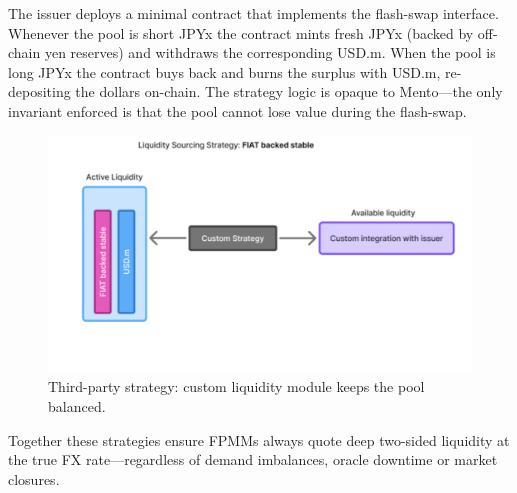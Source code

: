 \documentclass[a4paper]{article}
\providecommand{\hyp}{-}
\theoremstyle{definition}
\begin{document}
The issuer deploys a minimal contract that
implements the flash\hyp swap interface.  Whenever the pool is short JPYx the
contract mints fresh JPYx (backed by off\hyp chain yen reserves) and withdraws
the corresponding USD.m.  When the pool is long JPYx the contract buys back and
burns the surplus with USD.m, re\hyp depositing the dollars on\hyp chain.  The
strategy logic is opaque to Mento—the only invariant enforced is that the pool
cannot lose value during the flash\hyp swap.
\begin{figure}[ht]
    \centering
    \includegraphics[width=0.6\linewidth]{figures/fpmm_2.png}
    \caption{Third\hyp party strategy: custom liquidity module keeps the pool balanced.}
\end{figure}

Together these strategies ensure FPMMs always quote deep two\hyp sided liquidity at the true
FX rate—regardless of demand imbalances, oracle downtime or market closures.
\end{document}
